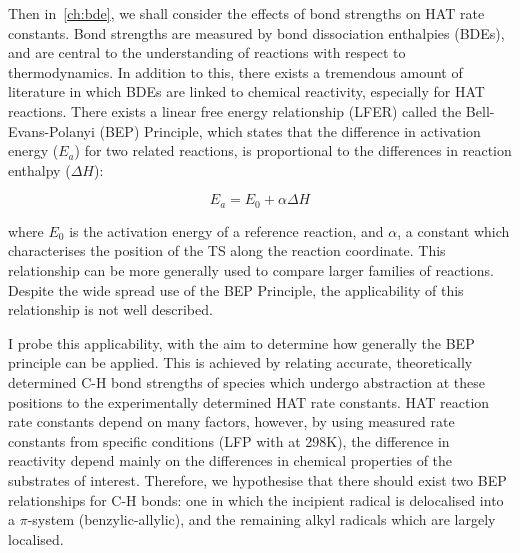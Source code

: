 {Then in~\ref{ch:bde}, we shall consider the effects of bond strengths on HAT rate constants. Bond strengths are measured by bond dissociation enthalpies (BDEs), and are central to the understanding of reactions with respect to thermodynamics. In addition to this, there exists a tremendous amount of literature in which BDEs are linked to chemical reactivity, especially for HAT reactions.\cite{Kochi1973, Tedder1982, Wijtmans2003, Pratt2004, Mayer2004} There exists a linear free energy relationship (LFER) called the Bell-Evans-Polanyi (BEP) Principle,\cite{Bell1936,Evans1938} which states that the difference in activation energy ($E_a$) for two related reactions, is proportional to the differences in reaction enthalpy ($\Delta H$):

\begin{equation}
  E_a = E_0 + \alpha \Delta H
  \label{eq:bep}
\end{equation}

\noindent where $E_0$ is the activation energy of a reference reaction, and $\alpha$, a constant which characterises the position of the TS along the reaction coordinate. This relationship can be more generally used to compare larger families of reactions. Despite the wide spread use of the BEP Principle, the applicability of this relationship is not well described.

I probe this applicability, with the aim to determine how generally the BEP principle can be applied. This is achieved by relating accurate, theoretically determined C-H bond strengths of species which undergo abstraction at these positions to the experimentally determined HAT rate constants. HAT reaction rate constants depend on many factors, however, by using measured rate constants from specific conditions (LFP with \cumo at 298K), the difference in reactivity depend mainly on the differences in chemical properties of the substrates of interest. Therefore, we hypothesise that there should exist two BEP relationships for C-H bonds: one in which the incipient radical is delocalised into a $\pi$-system (benzylic-allylic), and the remaining alkyl radicals which are largely localised.

}
